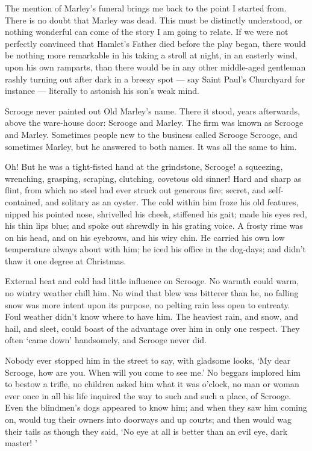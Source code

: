 \documentclass[11pt,twoside]{article}\makeatletter
\begin{document}
The mention of Marley's funeral brings me back to the point I started from.  There is no doubt that Marley was dead.  This must be distinctly understood, or nothing wonderful can come of the story I am going to relate.  If we were not perfectly convinced that Hamlet's Father died before the play began, there would be nothing more remarkable in his taking a stroll at night, in an easterly wind, upon his own ramparts, than there   would be in any other middle-aged gentleman rashly  turning out after dark in a breezy spot — say Saint  Paul's Churchyard for instance — literally to astonish his son's weak mind.  \par
Scrooge never painted out Old Marley's name.  There it stood, years afterwards, above the ware-house door: Scrooge and Marley.  The firm was known as Scrooge and Marley. Sometimes people new to the business called Scrooge Scrooge, and sometimes Marley, but he answered to both names.  It was all the same to him.  \par
Oh!  But he was a tight-fisted hand at the grindstone, Scrooge!  a squeezing, wrenching, grasping, scraping, clutching, covetous old sinner!  Hard and sharp as flint, from which no steel had ever struck out generous fire; secret, and self-contained, and solitary as an oyster.  The cold within him froze his old features, nipped his pointed nose, shrivelled his cheek, stiffened his gait; made his eyes red, his thin lips blue; and spoke out shrewdly in his grating voice.  A frosty rime was on his head, and on his eyebrows, and his wiry chin. He   carried his own low temperature always about with him; he iced his office in the dog-days; and didn't thaw it one degree at Christmas.  \par
External heat and cold had little influence on Scrooge. No warmth could warm, no wintry weather chill him.  No wind that blew was bitterer than he, no falling snow was more intent upon its purpose, no pelting rain less open to entreaty. Foul weather didn't know where to have him.  The heaviest rain, and snow, and hail, and sleet, could boast of the advantage over him in only one respect.  They often ‘came down’ handsomely, and Scrooge never did.  \par
Nobody ever stopped him in the street to say, with gladsome looks, ‘My dear Scrooge, how are you.  When will you come to see me.’  No beggars implored him to bestow a trifle, no children asked him what it was o'clock, no man or woman ever once in all his life inquired the way to such and such a place, of Scrooge.  Even the blindmen's dogs appeared to know him; and when they saw him coming on, would tug their owners into doorways  and up courts; and then would wag their tails as though they said, ‘No eye at all is better than an evil eye, dark master! ’\par
\end{document}
